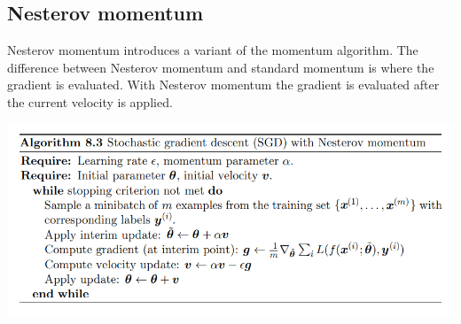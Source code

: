 \subsection{Nesterov momentum}
Nesterov momentum introduces a variant of the momentum algorithm. The difference between Nesterov momentum and standard momentum is where the gradient is evaluated. With Nesterov momentum the gradient is evaluated after the current velocity is applied.
\begin{center}
    \includegraphics[]{images/nesterov momentum.png}
\end{center}

